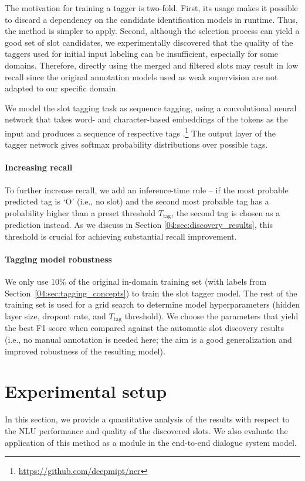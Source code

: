 The motivation for training a tagger is two-fold.
First, its usage makes it possible to discard a dependency on the candidate identification models in runtime.
Thus, the method is simpler to apply. 
Second, although the selection process can yield a good set of slot candidates, we experimentally discovered that the quality of the taggers used for initial input labeling can be insufficient, especially for some domains.
Therefore, directly using the merged and filtered slots may result in low recall since the original annotation models used as weak supervision are not adapted to our specific domain.

We model the slot tagging task as sequence tagging, using a convolutional neural network that takes word- and character-based embeddings of the tokens as the input and produces a sequence of respective tags \cite{lample2016neural}.\footnote{\url{https://github.com/deepmipt/ner}}
The output layer of the tagger network gives softmax probability distributions over possible tags.

\paragraph{Increasing recall} To further increase recall, we add an inference-time rule -- if the most probable predicted tag is `O' (i.e., no slot) and the second most probable tag has a probability higher than a preset threshold $T_{\text{tag}}$, the second tag is chosen as a prediction instead.
As we discuss in Section \ref{04:sec:discovery_results}, this threshold is crucial for achieving substantial recall improvement.

\paragraph{Tagging model robustness} 
We only use 10\% of the original in-domain training set (with labels from Section~\ref{04:sec:tagging_concepts}) to train the slot tagger model.
The rest of the training set is used for a grid search to determine model hyperparameters (hidden layer size, dropout rate, and $T_{\text{tag}}$ threshold). We choose the parameters that yield the best F1 score when compared against the automatic slot discovery results (i.e., no manual annotation is needed here; the aim is a good generalization and improved robustness of the resulting model).


\section{Experimental setup}
\label{04:sec:experiments}
In this section, we provide a quantitative analysis of the results with respect to the NLU performance and quality of the discovered slots.
We also evaluate the application of this method as a module in the end-to-end dialogue system model.
